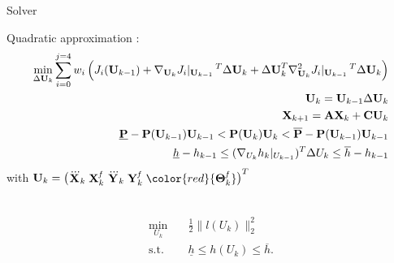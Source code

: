 \begin{frame}{Solver}
\begin{minipage}{0.48\textwidth}
Quadratic approximation :
\begin{equation*}
\begin{aligned}
    \min_{{\Delta \bf U}_k} \sum_{i=0}^{j=4} w_i 
    \left(
      J_i({\bf U}_{k-1}) +
      \nabla_{{\bf U}_k} J_i|_{{\bf U}_{k-1}}\,^T {\Delta \bf U}_k +
      {\Delta \bf U}_k^T \nabla ^{2}_{{\bf U}_k} J_i|_{{\bf U}_{k-1}}\,^T {\Delta \bf U}_k
    \right)\\
    {\bf U}_{k} = {\bf U}_{k-1} {\Delta \bf U}_k \\
    {\bf X}_{k+1} = {\bf A}{\bf X}_{k} + {\bf C} {\bf U}_k \\
    \underline{\bf P} - {\bf P}{({\bf U}_{k-1})}{\bf U}_{k-1} 
    < {\bf P}{({\bf U}_k)} {\bf U}_k  
    < \overline{\bf P}  - {\bf P}{({\bf U}_{k-1})}{\bf U}_{k-1} \\
    \underline{h} - h_{k-1} \leq (\nabla_{U_{k}} h_k|_{U_{k-1}})^T \Delta U_k \leq \overline{h} - h_{k-1}
\end{aligned}
\end{equation*}
  with ${\bf U}_k=\begin{pmatrix} \dddot{\bf X}_k \; {\bf X}_k^\mathit{f}\; \dddot{\bf Y}_k \;{\bf Y}_k^\mathit{f} \;\color{red}{{\bf \Theta}_k^\mathit{f}}\end{pmatrix}^T$
\end{minipage}\\



\begin{subequations}
    \label{eq:nonlinear_problem}
    \begin{align}
        \min_{U_k}  \quad & \frac{1}{2} \lVert l(U_k) \rVert_2^2 \label{eq:nonlinear_problem_objective}\\
        \text{s.t.} \quad & \underline{h} \leq h(U_k) \leq \overline{h} \label{eq:nonlinear_problem_constraints}.
    \end{align}
\end{subequations}


\end{frame}

